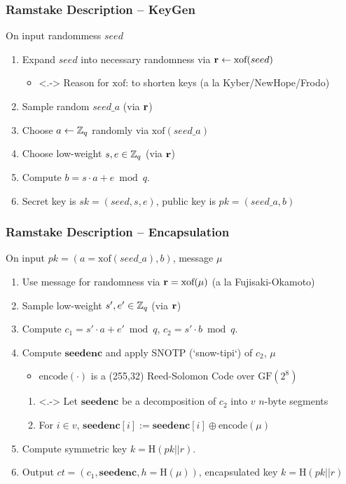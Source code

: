 \documentclass[11pt,t,xcolor=pdftex,svgnames,handout]{beamer}
\newcommand{\xof}{\ensuremath{\text{xof}}}
\begin{document}
\begin{frame}\frametitle{Ramstake Description -- KeyGen}
\onslide<+->
On input randommess $seed$
\begin{enumerate}
\item<+-> Expand $seed$ into necessary randomness via $\vecr \gets
  \xof(seed)$
\begin{itemize}
\smallskip
\item<.-> Reason for $\text{xof}$: to
  shorten keys (a la Kyber/NewHope/Frodo)
\smallskip
\end{itemize}
\item<+-> Sample random $seed\_a$ (via $\mathbf{r}$)
\medskip
\item<+-> Choose $a \gets \mathbb{Z}_q$ randomly via $\text{xof}(seed\_a)$ 
\medskip
\item<+-> Choose \alert{low-weight} $s, e \in \mathbb{Z}_q$ (via $\mathbf{r}$)
\medskip
\item<+-> Compute $b = s\cdot a + e \bmod{q}$. 
\medskip
\item<+-> Secret key is $sk=(seed,s,e)$, public key is $pk=(seed\_a, b)$
\end{enumerate}
\end{frame}

\begin{frame}\frametitle{Ramstake Description -- Encapsulation}
\onslide<+->
On input $pk=(a=\xof(seed\_a),b)$, message $\mu$
\begin{enumerate}
\item<+-> Use message for randomness via $\vecr=\xof(\mu)$ (a la Fujisaki-Okamoto)
\smallskip
\item<+-> Sample \alert{low-weight} $s', e' \in \mathbb{Z}_q$ (via $\mathbf{r}$)
\smallskip
\item<+-> Compute $c_1 = s'\cdot a + e' \bmod{q}$, $c_2 = s'\cdot b
  \bmod{q}$.
\smallskip
\item<+->  Compute $\mathbf{seedenc}$ and apply SNOTP (`snow-tipi`)  of $c_2$, $\mu$
\smallskip
\begin{itemize}
\item<+-> $\text{encode}(\cdot)$ is a (255,32) Reed-Solomon Code over $\text{GF}(2^8)$
\end{itemize}
\begin{enumerate}
\item<.-> Let $\mathbf{seedenc}$ be a  decomposition of $c_2$ into
  $v$ $n$-byte segments
\smallskip
\item<+-> For $i \in v$, $\mathbf{seedenc}[i] :=
  \mathbf{seedenc}[i] \oplus \text{encode}(\mu)$
\smallskip

\end{enumerate}
\item<+-> Compute symmetric key $k=\text{H}(pk || r)$.
\smallskip
\item <+-> Output $ct = (c_1, \mathbf{seedenc}, h=\text{H}(\mu))$, encapsulated
  key $k=\text{H}(pk || r)$
\end{enumerate}
\end{frame}
\end{document}
